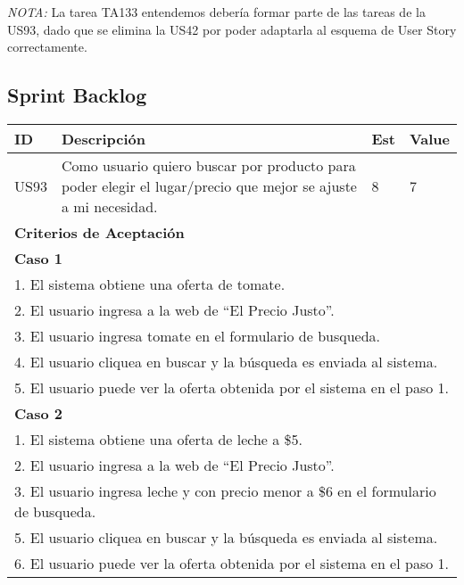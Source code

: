 \emph{NOTA:} La tarea TA133 entendemos debería formar parte de las tareas de la US93, dado que se elimina la US42 por poder adaptarla al esquema de User Story correctamente.

\subsection{Sprint Backlog}

\begin{tabular}{|p{1cm}|p{10cm}|p{1cm}|p{1cm}|}
\hline
\hline
\textbf{ID}&\textbf{Descripción}&\textbf{Est}&\textbf{Value}\\
\hline
\hline
US93&Como usuario quiero buscar por producto para poder elegir el lugar/precio que mejor se ajuste a mi necesidad.& 8& 7\\
\hline
\hline
\multicolumn{4}{|p{13cm}|}{ \textbf{Criterios de Aceptación}} \\
\hline
\hline
\multicolumn{4}{|p{13cm}|}{\textbf{Caso 1}}\\
\multicolumn{4}{|p{13cm}|}{1. El sistema obtiene una oferta de tomate.}\\
\multicolumn{4}{|p{13cm}|}{2. El usuario ingresa a la web de ``El Precio Justo''.}\\
\multicolumn{4}{|p{13cm}|}{3. El usuario ingresa tomate en el formulario de busqueda.}\\
\multicolumn{4}{|p{13cm}|}{4. El usuario cliquea en buscar y la búsqueda es enviada al sistema.}\\
\multicolumn{4}{|p{13cm}|}{5. El usuario puede ver la oferta obtenida por el sistema en el paso 1.}\\
\multicolumn{4}{|p{13cm}|}{\textbf{Caso 2}}\\
\multicolumn{4}{|p{13cm}|}{1. El sistema obtiene una oferta de leche a \$5.}\\
\multicolumn{4}{|p{13cm}|}{2. El usuario ingresa a la web de ``El Precio Justo''.}\\
\multicolumn{4}{|p{13cm}|}{3. El usuario ingresa leche y con precio menor a \$6 en el formulario de busqueda.}\\
\multicolumn{4}{|p{13cm}|}{5. El usuario cliquea en buscar y la búsqueda es enviada al sistema.}\\
\multicolumn{4}{|p{13cm}|}{6. El usuario puede ver la oferta obtenida por el sistema en el paso 1.}\\
\hline
\hline
\end{tabular}

